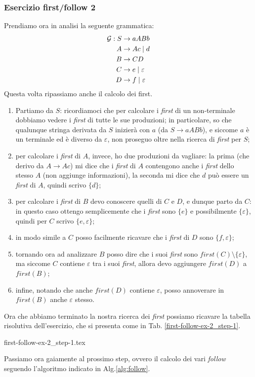 \documentclass[class=book, crop=false, oneside, 12pt]{standalone}
\begin{document}
\subsubsection{Esercizio first/follow 2}
\label{first-follow-ex-2}
Prendiamo ora in analisi la seguente grammatica:
\begin{align*}
       \mathcal{G}: S &\to aABb \\
       A &\to Ac \mid d \\
       B &\to CD \\
       C &\to e \mid \varepsilon \\
       D &\to f \mid \varepsilon
\end{align*}
Questa volta ripassiamo anche il calcolo dei first.
\begin{enumerate}
    \item Partiamo da \(S\): ricordiamoci che per calcolare i \emph{first} di un non-terminale dobbiamo vedere i \emph{first} di tutte le sue produzioni; in particolare, so che qualunque stringa derivata da \(S\) inizierà con \(a\) (da \(S \to aABb\)), e siccome \(a\) è un terminale ed è diverso da \(\varepsilon\), non proseguo oltre nella ricerca di \emph{first} per \(S\);
    \item per calcolare i \emph{first} di \(A\), invece, ho due produzioni da vagliare: la prima (che derivo da \(A \to Ac\)) mi dice che i \emph{first} di \(A\) contengono anche i \emph{first} dello stesso \(A\) (non aggiunge informazioni), la seconda mi dice che \(d\) può essere un \emph{first} di \(A\), quindi scrivo \(\{d\}\);
    \item per calcolare i \emph{first} di \(B\) devo conoscere quelli di \(C\) e \(D\), e dunque parto da \(C\): in questo caso ottengo semplicemente che i \emph{first} sono \(\{e\}\) e possibilmente \(\{\varepsilon\}\), quindi per \(C\) scrivo \(\{e, \varepsilon\}\);
    \item in modo simile a \(C\) posso facilmente ricavare che i \emph{first} di \(D\) sono \(\{f, \varepsilon\}\);
    \item tornando ora ad analizzare \(B\) posso dire che i suoi \emph{first} sono \(first(C) \setminus \{\varepsilon\}\), ma siccome \(C\) contiene \(\varepsilon\) tra i suoi \emph{first}, allora devo aggiungere \(first(D)\) a \(first(B)\);
    \item infine, notando che anche \(first(D)\) contiene \(\varepsilon\), posso annoverare in \(first(B)\) anche \(\varepsilon\) stesso.    
\end{enumerate}
Ora che abbiamo terminato la nostra ricerca dei \emph{first} possiamo ricavare la tabella risolutiva dell'esercizio, che si presenta come in Tab. \ref{first-follow-ex-2_step-1}.
\begin{table}[H]
	\centering
	{first-follow-ex-2_step-1.tex}
    \caption{Esercizio \ref{first-follow-ex-2} su first/follow, step 1}
    \label{first-follow-ex-2_step-1}
\end{table}
Passiamo ora gaiamente al prossimo step, ovvero il calcolo dei vari \emph{follow} seguendo l'algoritmo indicato in Alg.\ref{alg:follow}.
\end{document}
